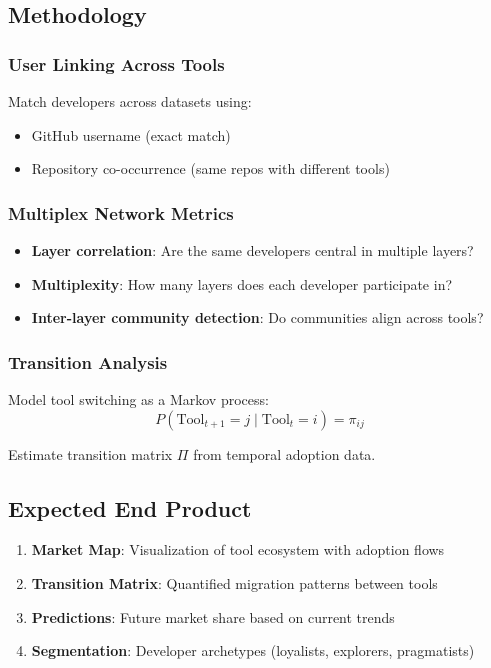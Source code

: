 \documentclass[11pt,letterpaper]{article}
\begin{document}
\subsection{Methodology}

\subsubsection{User Linking Across Tools}

Match developers across datasets using:
\begin{itemize}
    \item GitHub username (exact match)
    \item Repository co-occurrence (same repos with different tools)
\end{itemize}

\subsubsection{Multiplex Network Metrics}

\begin{itemize}
    \item \textbf{Layer correlation}: Are the same developers central in multiple layers?
    \item \textbf{Multiplexity}: How many layers does each developer participate in?
    \item \textbf{Inter-layer community detection}: Do communities align across tools?
\end{itemize}

\subsubsection{Transition Analysis}

Model tool switching as a Markov process:
\[
P(\text{Tool}_{t+1} = j \mid \text{Tool}_t = i) = \pi_{ij}
\]

Estimate transition matrix $\Pi$ from temporal adoption data.

\subsection{Expected End Product}

\begin{enumerate}
    \item \textbf{Market Map}: Visualization of tool ecosystem with adoption flows
    \item \textbf{Transition Matrix}: Quantified migration patterns between tools
    \item \textbf{Predictions}: Future market share based on current trends
    \item \textbf{Segmentation}: Developer archetypes (loyalists, explorers, pragmatists)
\end{enumerate}
\end{document}
